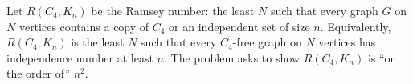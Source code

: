 Let $R(C_4,K_n)$ be the Ramsey number: the least $N$ such that every graph $G$ on $N$ vertices contains a copy of $C_4$ or an independent set of size $n$.
Equivalently, $R(C_4,K_n)$ is the least $N$ such that every $C_4$-free graph on $N$ vertices has independence number at least $n$.
The problem asks to show $R(C_4,K_n)$ is ``on the order of'' $n^2$.
